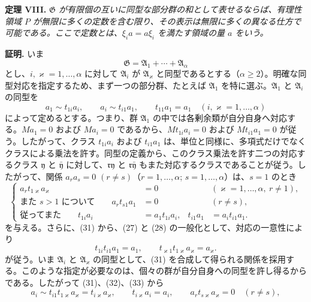 \documentclass[11pt]{article}
\begin{document}
\textbf{定理 VIII.} \emph{$\mathfrak G$ が有限個の互いに同型な部分群の和として表せるならば、有理性領域 $P$ が無限に多くの定数を含む限り、その表示は無限に多くの異なる仕方で可能である。ここで定数とは、$\xi_i a=a\xi_i$ を満たす領域の量 $a$ をいう。}

\textbf{証明.} いま
\[
  \mathfrak G=\mathfrak A_1+\cdots+\mathfrak A_\alpha
\]
とし、$i,\varkappa=1,\ldots,\alpha$ に対して $\mathfrak A_i$ が $\mathfrak A_\varkappa$ と同型であるとする（$\alpha\ge2$）。明確な同型対応を指定するため、まず一つの部分群、たとえば $\mathfrak A_1$ を特に選ぶ。$\mathfrak A_1$ と $\mathfrak A_i$ の同型を
\begin{equation}
 a_1\sim t_{1i}a_i,
 \qquad
 a_i\sim t_{i1}a_1,
 \qquad
 t_{11}a_1=a_1
 \quad(i,\varkappa=1,
\ldots,\alpha)
\tag{31}
\end{equation}
によって定めるとする。つまり、群 $\mathfrak A_1$ の中では各剰余類が自分自身へ対応する。$Ma_1=0$ および $Ma_i=0$ であるから、$Mt_{1i}a_i=0$ および $Mt_{i1}a_1=0$ が従う。したがって、クラス $t_{1i}a_i$ および $t_{i1}a_1$ は、単位と同様に、多項式だけでなくクラスによる乗法を許す。同型の定義から、このクラス乗法を許す二つの対応するクラス $\mathfrak y$ と $\bar{\mathfrak y}$ に対して、$\mathfrak r\mathfrak y$ と $\mathfrak r\bar{\mathfrak y}$ もまた対応するクラスであることが従う。したがって、関係 $a_ra_s=0$ $(r\ne s)$（$r=1,\ldots,\alpha$; $s=1,\ldots,\alpha$）は、$s=1$ のとき
\begin{equation}
\left\{
\begin{aligned}
 a_r t_{1\varkappa}a_\varkappa&=0 &&(\varkappa=1,
\ldots,
\alpha,
\ r\ne1),\\
 \text{また }s>1\text{ について}\qquad a_r t_{s1}a_1&=0 &&(r\ne s),\\
 \text{従ってまた}\qquad t_{1i}a_i&=a_1t_{1i}a_i,
 &t_{i1}a_1&=a_it_{i1}a_1.
\end{aligned}\right.
\tag{32}
\end{equation}
を与える。さらに、(31) から、(27) と (28) の一般化として、対応の一意性により
\begin{equation}
 t_{1i}t_{i1}a_1=a_1,
 \qquad
 t_{\varkappa1}t_{1\varkappa}a_\varkappa=a_\varkappa.
\tag{33}
\end{equation}
が従う。いま $\mathfrak A_i$ と $\mathfrak A_\varkappa$ の同型として、(31) を合成して得られる関係を採用する。このような指定が必要なのは、個々の群が自分自身への同型を許し得るからである。したがって (31)、(32)、(33) から
\begin{equation}
 a_i\sim t_{i1}t_{1\varkappa}a_\varkappa=t_{i\varkappa}a_\varkappa,
 \qquad
 t_{i\varkappa}a_i=a_i,
 \qquad
 a_rt_{s\varkappa}a_\varkappa=0\quad(r\ne s),
\tag{34}
\end{equation}
\end{document}
